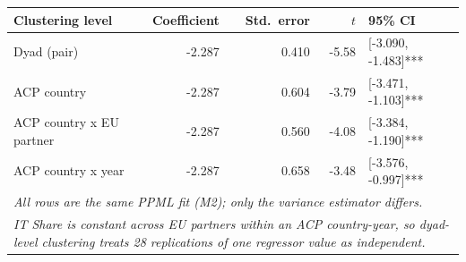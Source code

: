 \begin{tabular}{lrrrl}
\midrule\midrule
Clustering level & Coefficient & Std.\ error & $t$ & 95\% CI \\
\midrule
Dyad (pair)                & -2.287 & 0.410 & -5.58 & [-3.090, -1.483]*** \\
ACP country                & -2.287 & 0.604 & -3.79 & [-3.471, -1.103]*** \\
ACP country x EU partner   & -2.287 & 0.560 & -4.08 & [-3.384, -1.190]*** \\
ACP country x year         & -2.287 & 0.658 & -3.48 & [-3.576, -0.997]*** \\
\midrule\midrule
\multicolumn{5}{l}{\emph{All rows are the same PPML fit (M2); only the variance estimator differs.}}\\
\multicolumn{5}{p{0.9\linewidth}}{\emph{IT Share is constant across EU partners within an ACP country-year, so dyad-level clustering treats 28 replications of one regressor value as independent.}}\\
\end{tabular}
